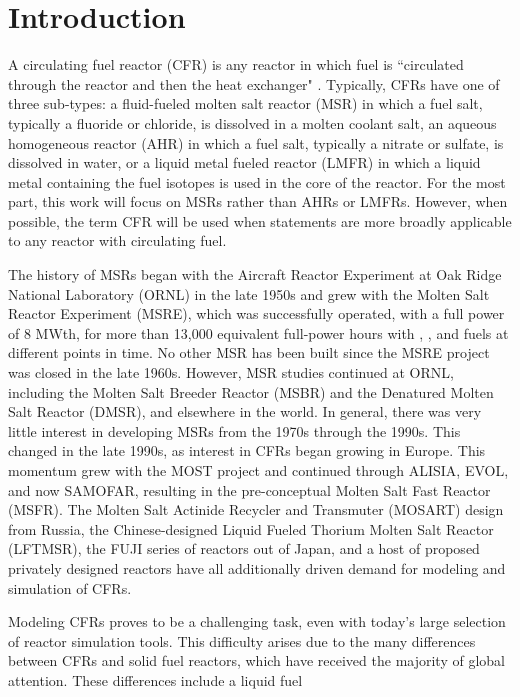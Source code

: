 \documentclass[review]{elsarticle}
\begin{document}
\section{Introduction} \label{sec:intro}
A circulating fuel reactor (CFR) is any reactor in which fuel is ``circulated
 through the reactor and then the heat exchanger" \cite{ergen_1954}.
 Typically, CFRs have one of three sub-types: a fluid-fueled molten salt reactor
 (MSR) in which a fuel salt, typically a fluoride or chloride, is dissolved
 in a molten coolant salt, an aqueous homogeneous reactor (AHR) in which
 a fuel salt, typically a nitrate or sulfate, is dissolved in water, or a
 liquid metal fueled reactor (LMFR) in which a liquid metal containing the fuel
 isotopes is used in the core of the reactor.
 For the most part, this work will focus on MSRs rather than AHRs or LMFRs. However,
 when possible, the term CFR will be used when statements are more broadly
 applicable to any reactor with circulating fuel.
\par The history of MSRs began with the Aircraft Reactor Experiment at Oak Ridge National
 Laboratory (ORNL) in the late 1950s and grew with the Molten Salt Reactor Experiment
 (MSRE), which was successfully operated, with a full power of 8 MWth, for more than 13,000
 equivalent full-power hours with , , and  fuels at different
 points in time. No other MSR has been built since the MSRE project was closed
 in the late 1960s. However, MSR studies continued at ORNL, including the Molten Salt Breeder
 Reactor (MSBR) and the Denatured Molten Salt Reactor (DMSR), and elsewhere in the world. In
 general, there was very little interest in
 developing MSRs from the 1970s through the 1990s. This
 changed in the late 1990s, as interest in CFRs began growing in Europe. This momentum
grew with the MOST project and continued through ALISIA, EVOL, and now SAMOFAR, resulting in
the pre-conceptual Molten Salt Fast Reactor (MSFR). The Molten Salt Actinide
Recycler and Transmuter (MOSART) design from Russia, the Chinese-designed
Liquid Fueled Thorium Molten Salt Reactor (LFTMSR), the
FUJI series of reactors out of Japan, and a host of proposed privately designed
reactors have all additionally driven demand for
modeling and simulation of CFRs. 
\par Modeling CFRs proves to be a challenging task, even with today's
large selection of reactor simulation tools. This difficulty arises due to
the many differences between CFRs and solid fuel reactors, which have received the
majority of global attention. These differences include a liquid fuel
\end{document}
